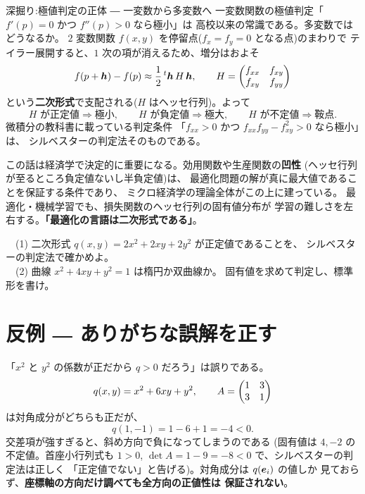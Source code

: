 \begin{itembox}[l]{深掘り:極値判定の正体 ― 一変数から多変数へ}
一変数関数の極値判定「$f'(p) = 0$ かつ $f''(p) > 0$ なら極小」は
高校以来の常識である。多変数ではどうなるか。
$2$ 変数関数 $f(x, y)$ を停留点($f_x = f_y = 0$ となる点)のまわりで
テイラー展開すると、$1$ 次の項が消えるため、増分はおよそ
\[
f(p + \bm{h}) - f(p) \approx \frac{1}{2}\,{}^t\bm{h}\,H\,\bm{h},
\qquad
H = \begin{pmatrix}f_{xx} & f_{xy} \\ f_{xy} & f_{yy}\end{pmatrix}
\]
という\textbf{二次形式}で支配される($H$ はヘッセ行列)。よって
\[
H \text{ が正定値} \Rightarrow \text{極小}, \qquad
H \text{ が負定値} \Rightarrow \text{極大}, \qquad
H \text{ が不定値} \Rightarrow \text{鞍点}.
\]
微積分の教科書に載っている判定条件
「$f_{xx} > 0$ かつ $f_{xx}f_{yy} - f_{xy}^2 > 0$ なら極小」は、
シルベスターの判定法そのものである。

この話は経済学で決定的に重要になる。効用関数や生産関数の\textbf{凹性}
(ヘッセ行列が至るところ負定値ないし半負定値)は、
最適化問題の解が真に最大値であることを保証する条件であり、
ミクロ経済学の理論全体がこの上に建っている。
最適化・機械学習でも、損失関数のヘッセ行列の固有値分布が
学習の難しさを左右する。\textbf{「最適化の言語は二次形式である」}。
\end{itembox}

\begin{mondai}\label{q:quad}
　(1) 二次形式 $q(x, y) = 2x^2 + 2xy + 2y^2$ が正定値であることを、
シルベスターの判定法で確かめよ。\\
　(2) 曲線 $x^2 + 4xy + y^2 = 1$ は楕円か双曲線か。
固有値を求めて判定し、標準形を書け。
\end{mondai}

\section{反例 ― ありがちな誤解を正す}

\begin{hanrei}[対角成分がすべて正でも正定値とは限らない]\label{hanrei:quad-diag}
「$x^2$ と $y^2$ の係数が正だから $q > 0$ だろう」は誤りである。
\[
q(x, y) = x^2 + 6xy + y^2, \qquad A = \begin{pmatrix}1 & 3 \\ 3 & 1\end{pmatrix}
\]
は対角成分がどちらも正だが、
\[
q(1, -1) = 1 - 6 + 1 = -4 < 0.
\]
交差項が強すぎると、斜め方向で負になってしまうのである
(固有値は $4, -2$ の不定値。首座小行列式も $1 > 0$,
$\det A = 1 - 9 = -8 < 0$ で、シルベスターの判定法は正しく
「正定値でない」と告げる)。対角成分は $q(\bm{e}_i)$ の値しか
見ておらず、\textbf{座標軸の方向だけ調べても全方向の正値性は
保証されない}。
\end{hanrei}

